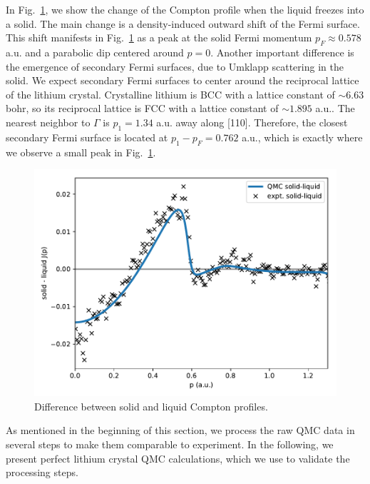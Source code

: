 \documentclass[aps,prb,showpacs,preprintnumbers,amsmath,amssymb,superscriptaddress,twocolumn]{revtex4-1}
\begin{document}
In Fig.~\ref{fig:s-l-djp}, we show the change of the Compton profile when the liquid freezes into a solid. The main change is a density-induced outward shift of the Fermi surface. This shift manifests in Fig.~\ref{fig:s-l-djp} as a peak at the solid Fermi momentum $p_F\approx0.578$ a.u. and a parabolic dip centered around $p=0$. Another important difference is the emergence of secondary Fermi surfaces, due to Umklapp scattering in the solid. We expect secondary Fermi surfaces to center around the reciprocal lattice of the lithium crystal. Crystalline lithium is BCC with a lattice constant of $\sim 6.63$ bohr, so its reciprocal lattice is FCC with a lattice constant of $\sim 1.895$ a.u.. The nearest neighbor to $\Gamma$ is $p_1=1.34$ a.u. away along [110]. Therefore, the closest secondary Fermi surface is located at $p_1-p_F=0.762$ a.u., which is exactly where we observe a small peak in Fig.~\ref{fig:s-l-djp}.

\begin{figure}[h]
\includegraphics[width=\linewidth]{li52e_sl-djp}
\caption{Difference between solid and liquid Compton profiles.\label{fig:s-l-djp}}
\end{figure}

As mentioned in the beginning of this section, we process the raw QMC data in several steps to make them comparable to experiment. In the following, we present perfect lithium crystal QMC calculations, which we use to validate the processing steps.
\end{document}
